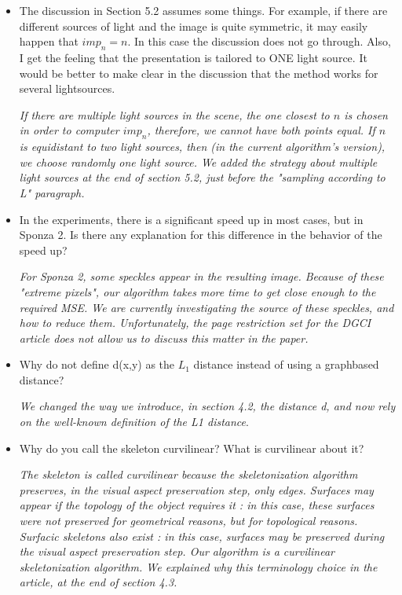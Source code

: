 \documentclass[final,envcountsame]{article}
\begin{document}
\begin{itemize}

\item The discussion in Section 5.2 assumes some things. For example, if there are different sources of light and the image is quite symmetric, it may easily happen that $imp_n=n$. In this case the discussion does not go through.
Also, I get the feeling that the presentation is tailored to ONE light source. It would be better to make clear in the discussion that the method works for several light­sources.

\textit{If there are multiple light sources in the scene, the one closest to $n$ is chosen in order to computer $imp_n$, therefore, we cannot have both points equal. If $n$ is equidistant to two light sources, then (in the current algorithm's version), we choose randomly one light source.
We added the strategy about multiple light sources at the end of section 5.2, just before the "sampling according to L" paragraph.}


\item In the experiments, there is a significant speed up in most cases, but in Sponza 2. Is there any explanation for this difference in the behavior of the speed up?

\textit{For Sponza 2, some speckles appear in the resulting image. Because of these "extreme pixels", our algorithm takes more time to get close enough to the required MSE. We are currently investigating the source of these speckles, and how to reduce them. Unfortunately, the page restriction set for the DGCI article does not allow us to discuss this matter in the paper.}\\


\item Why do not define d(x,y) as the $L_1$ ­distance instead of using a graph­based distance?

\textit{We changed the way we introduce, in section 4.2, the distance d, and now rely on the well-known definition of the L1 distance}.\\


\item Why do you call the skeleton curvilinear? What is curvilinear about it?

\textit{The skeleton is called curvilinear because the skeletonization algorithm preserves, in the visual aspect preservation step, only edges. Surfaces may appear if the topology of the object requires it : in this case, these surfaces were not preserved for geometrical reasons, but for topological reasons. Surfacic skeletons also exist : in this case, surfaces may be preserved during the visual aspect preservation step. Our algorithm is a curvilinear skeletonization algorithm.
We explained why this terminology choice in the article, at the end of section 4.3.}\\



\end{itemize}
\end{document}

